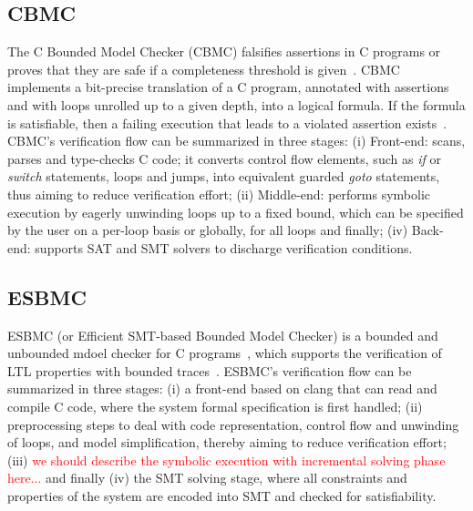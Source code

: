 \documentclass[10pt,conference]{IEEEtran}
\begin{document}
\subsection{CBMC}
The C Bounded Model Checker (CBMC) falsifies assertions in C programs or proves that they are safe if a completeness threshold is given~\cite{Kroening}. CBMC implements a bit-precise translation of a C program, annotated with assertions and with loops unrolled up to a given depth, into a logical formula. If the formula is satisfiable, then a failing execution that leads to a violated assertion exists~\cite{Kroening}. CBMC's verification flow can be summarized in three stages: (i) Front-end: scans, parses and type-checks C code; it converts control flow elements, such as \textit{if} or \textit{switch} statements, loops and jumps, into equivalent guarded \textit{goto} statements, thus aiming to reduce verification effort; (ii) Middle-end: performs symbolic execution by eagerly unwinding loops up to a fixed bound, which can be specified by the user on a per-loop basis or globally, for all loops and finally; (iv) Back-end: supports SAT and SMT solvers to discharge verification conditions. 

\subsection{ESBMC}
ESBMC (or Efficient SMT-based Bounded Model Checker) is a bounded and unbounded mdoel checker for C programs~\cite{esbmc2018}, which supports the verification of LTL properties with bounded traces~\cite{DBLP:journals/sosym/MorseCN015}. ESBMC's verification flow can be summarized in three stages: (i) a front-end based on clang that can read and compile C code, where the system formal specification is first handled; (ii) preprocessing steps to deal with code representation, control flow and unwinding of loops, and model simplification, thereby aiming to reduce verification effort; (iii) \textcolor{red}{we should describe the symbolic execution with incremental solving phase here...} and finally (iv) the SMT solving stage, where all constraints and properties of the system are encoded into SMT and checked for satisfiability. 
\end{document}
